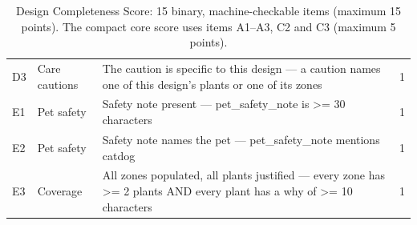 \begin{table}[!ht]
\begin{tabular}{llp{10.4cm}c}
D3 & Care cautions & The caution is specific to this design --- a caution names one of this design's plants or one of its zones & 1 \\
E1 & Pet safety & Safety note present --- pet\_safety\_note is >= 30 characters & 1 \\
E2 & Pet safety & Safety note names the pet --- pet\_safety\_note mentions cat\textbar{}dog & 1 \\
E3 & Coverage & All zones populated, all plants justified --- every zone has >= 2 plants AND every plant has a why of >= 10 characters & 1 \\
\bottomrule
\end{tabular}
\caption{Design Completeness Score: 15 binary, machine-checkable items (maximum 15 points). The compact core score uses items A1--A3, C2 and C3 (maximum 5 points).}
\end{table}
